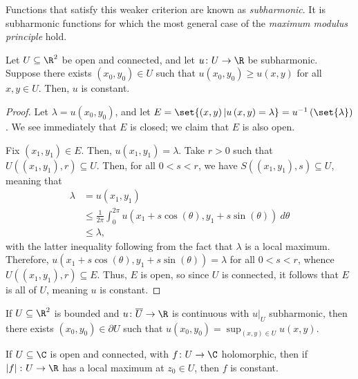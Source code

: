 \documentclass[10pt]{mypackage}
\begin{document}
Functions that satisfy this weaker criterion are known as \textit{subharmonic}. It is subharmonic functions for which the most general case of the \textit{maximum modulus principle} hold.
\begin{theorem}
  Let $U\subseteq \R^{2}$ be open and connected, and let $u\colon U\rightarrow \R$ be subharmonic. Suppose there exists $\left( x_0,y_0 \right)\in U$ such that $u\left( x_0,y_0 \right)\geq u\left( x,y \right)$ for all $x,y\in U$. Then, $u$ is constant.
\end{theorem}
\begin{proof}
  Let $\lambda = u\left( x_0,y_0 \right)$, and let $E = \set{\left( x,y \right) | u\left( x,y \right) = \lambda} = u^{-1}\left( \set{\lambda} \right)$. We see immediately that $E$ is closed; we claim that $E$ is also open.%

  Fix $\left( x_1,y_1 \right)\in E$. Then, $u\left( x_1,y_1 \right) = \lambda$. Take $r > 0$ such that $U\left( \left( x_1,y_1 \right),r \right)\subseteq U$. Then, for all $0 < s < r$, we have $S\left( \left( x_1,y_1 \right),s \right)\subseteq U$, meaning that
  \begin{align*}
    \lambda &= u\left( x_1,y_1 \right) \\
            &\leq \frac{1}{2\pi} \int_{0}^{2\pi} u\left( x_1 + s\cos\left( \theta \right),y_1+s\sin\left( \theta \right) \right)\:d\theta\\
            &\leq \lambda,
  \end{align*}
  with the latter inequality following from the fact that $\lambda$ is a local maximum. Therefore, $u\left( x_1 + s\cos\left( \theta \right),y_1 + s\sin\left( \theta \right) \right) = \lambda$ for all $0 < s < r$, whence $U\left( \left( x_1,y_1 \right),r \right)\subseteq E$. Thus, $E$ is open, so since $U$ is connected, it follows that $E$ is all of $U$, meaning $u$ is constant.
\end{proof}
\begin{corollary}
  If $U\subseteq \R^2$ is bounded and $u\colon \overline{U}\rightarrow \R$ is continuous with $u|_{U}$ subharmonic, then there exists $\left( x_0,y_0 \right)\in \partial U$ such that $u\left( x_0,y_0 \right) = \sup_{\left( x,y \right)\in U} u\left( x,y \right)$.
\end{corollary}
\begin{corollary}
  If $U\subseteq \C$ is open and connected, with $f\colon U\rightarrow \C$ holomorphic, then if $\left\vert f \right\vert\colon U\rightarrow \R$ has a local maximum at $z_0\in U$, then $f$ is constant.
\end{corollary}
\end{document}
